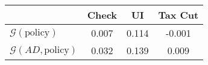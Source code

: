 \begin{tabular}{@{}lccc@{}}
\toprule
                          & Check      & UI    & Tax Cut    \\  \midrule
$\mathcal{G}(\text{policy})$ & 0.007  & 0.114  & -0.001     \\
$\mathcal{G}(AD,\text{policy})$ & 0.032  & 0.139  & 0.009     \\
\end{tabular}
